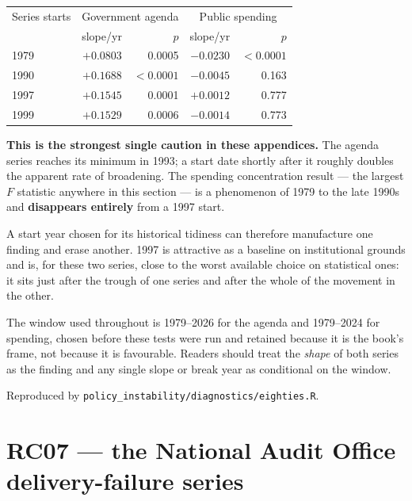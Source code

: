 \begin{threeparttable}
\caption{Trend in concentration by start year}
\begin{tabular}{lrrrr}
\toprule
Series starts & \multicolumn{2}{c}{Government agenda} & \multicolumn{2}{c}{Public spending} \\
& slope/yr & $p$ & slope/yr & $p$ \\
\midrule
1979 & $+0.0803$ & 0.0005 & $-0.0230$ & $<0.0001$ \\
1990 & $+0.1688$ & $<0.0001$ & $-0.0045$ & 0.163 \\
1997 & $+0.1545$ & 0.0001 & $+0.0012$ & 0.777 \\
1999 & $+0.1529$ & 0.0006 & $-0.0014$ & 0.773 \\
\bottomrule
\end{tabular}
\begin{tablenotes}\footnotesize
\item \textbf{This is the strongest single caution in these appendices.} The agenda series reaches
its minimum in 1993; a start date shortly after it roughly doubles the apparent rate of broadening.
The spending concentration result --- the largest $F$ statistic anywhere in this section --- is a
phenomenon of 1979 to the late 1990s and \textbf{disappears entirely} from a 1997 start.
\item A start year chosen for its historical tidiness can therefore manufacture one finding and
erase another. 1997 is attractive as a baseline on institutional grounds and is, for these two
series, close to the worst available choice on statistical ones: it sits just after the trough of
one series and after the whole of the movement in the other.
\item The window used throughout is 1979--2026 for the agenda and 1979--2024 for spending, chosen
before these tests were run and retained because it is the book's frame, not because it is
favourable. Readers should treat the \emph{shape} of both series as the finding and any single
slope or break year as conditional on the window.
\item Reproduced by \texttt{policy\_instability/diagnostics/eighties.R}.
\end{tablenotes}
\end{threeparttable}

\section{RC07 --- the National Audit Office delivery-failure series}

